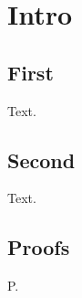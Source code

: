 \documentclass{svmult}
\begin{document}
\chapter{Intro}
\section{First}
Text.
\section{Second}
Text.
\appendix
\section{Proofs}
P.
\end{document}
